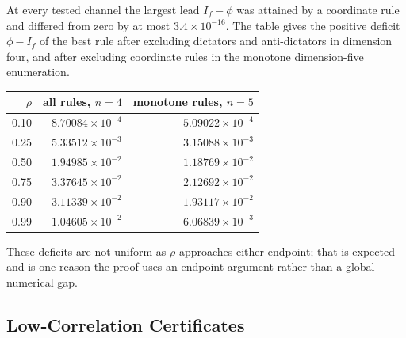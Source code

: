 At every tested channel the largest lead \(I_f-\phi\) was attained by
a coordinate rule and differed from zero by at most
\(3.4\times10^{-16}\). The table gives the positive deficit
\(\phi-I_f\) of the best rule after excluding dictators and
anti-dictators in dimension four, and after excluding coordinate rules
in the monotone dimension-five enumeration.
\begin{center}
{\small\setlength{\tabcolsep}{7pt}\renewcommand{\arraystretch}{1.1}
\begin{tabular}{@{}rrr@{}}
\toprule
\(\rho\) & all rules, \(n=4\) & monotone rules, \(n=5\)\\ \midrule
0.10 & \(8.70084\times10^{-4}\) & \(5.09022\times10^{-4}\)\\
0.25 & \(5.33512\times10^{-3}\) & \(3.15088\times10^{-3}\)\\
0.50 & \(1.94985\times10^{-2}\) & \(1.18769\times10^{-2}\)\\
0.75 & \(3.37645\times10^{-2}\) & \(2.12692\times10^{-2}\)\\
0.90 & \(3.11339\times10^{-2}\) & \(1.93117\times10^{-2}\)\\
0.99 & \(1.04605\times10^{-2}\) & \(6.06839\times10^{-3}\)\\
\bottomrule
\end{tabular}}
\end{center}
These deficits are not uniform as \(\rho\) approaches either endpoint;
that is expected and is one reason the proof uses an endpoint argument
rather than a global numerical gap.

\subsection{Low-Correlation Certificates}

